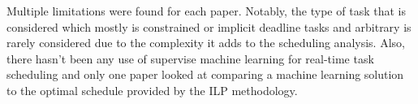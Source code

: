 Multiple limitations were found for each 
paper. Notably, the type of task that is 
considered which mostly is constrained or implicit deadline tasks
and arbitrary is rarely considered due to the complexity it adds
to the scheduling analysis.
Also, there hasn't been any use of supervise machine learning 
for real-time task scheduling
and only one paper looked at comparing a machine learning solution
to the optimal schedule provided by the ILP methodology.